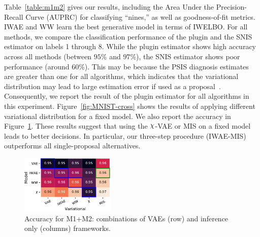Table~\ref{table:m1m2} gives our results, including the Area Under the Precision-Recall Curve (AUPRC) for classifying ``nines,'' as well as goodness-of-fit metrics. IWAE and WW learn the best generative model in terms of IWELBO. For all methods, we compare the classification performance of the plugin and the SNIS estimator on labels 1 through 8. While the plugin estimator shows high accuracy across all methods (between $95\%$ and $97\%$), the SNIS estimator shows poor performance (around $60\%$). This may be because the PSIS diagnosis estimates are greater than one for all algorithms, which indicates that the variational distribution may lead to large estimation error if used as a proposal~\cite{pmlr-v80-yao18a}. 
Consequently, we report the result of the plugin estimator for all algorithms in this experiment. Figure~\ref{fig:MNIST-cross} shows the results of applying different variational distribution for a fixed model. We also report the accuracy in Figure~\ref{fig:MNIST-acc}. These results suggest that using the $\rchi$-VAE or MIS on a fixed model leads to better decisions. In particular, our three-step procedure (IWAE-MIS) outperforms all single-proposal alternatives.

\begin{figure}
    \centering
    \includegraphics[width=0.4\textwidth]{figures/mnist_other_cross.pdf}
    \caption[Accuracy for M1+M2]{
    Accuracy for M1+M2: combinations of VAEs (row) and inference only (columns) frameworks. 
    }
    \label{fig:MNIST-acc}
\end{figure}
